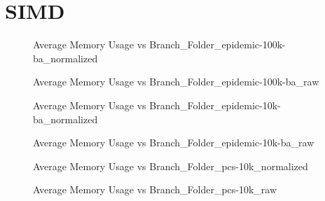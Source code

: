 \section{SIMD}
\begin{figure}[H]
\centering

\caption{Average Memory Usage vs Branch\_Folder\_epidemic-100k-ba\_normalized}
\end{figure}
\vspace{1cm}
\begin{figure}[H]
\centering

\caption{Average Memory Usage vs Branch\_Folder\_epidemic-100k-ba\_raw}
\end{figure}
\vspace{1cm}
\newpage
\begin{figure}[H]
\centering

\caption{Average Memory Usage vs Branch\_Folder\_epidemic-10k-ba\_normalized}
\end{figure}
\vspace{1cm}
\begin{figure}[H]
\centering

\caption{Average Memory Usage vs Branch\_Folder\_epidemic-10k-ba\_raw}
\end{figure}
\vspace{1cm}
\newpage
\begin{figure}[H]
\centering

\caption{Average Memory Usage vs Branch\_Folder\_pcs-10k\_normalized}
\end{figure}
\vspace{1cm}
\begin{figure}[H]
\centering

\caption{Average Memory Usage vs Branch\_Folder\_pcs-10k\_raw}
\end{figure}
